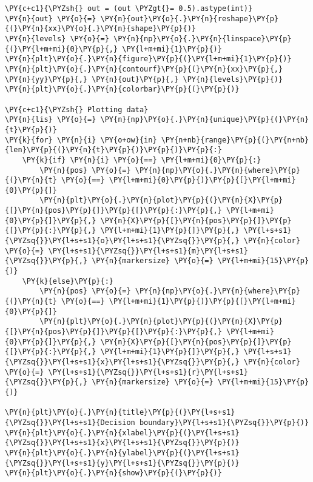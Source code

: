 \begin{tcolorbox}[breakable, size=fbox, boxrule=1pt, pad at break*=1mm,colback=cellbackground, colframe=cellborder]
\begin{Verbatim}[commandchars=\\\{\}]
\PY{c+c1}{\PYZsh{} out = (out \PYZgt{}= 0.5).astype(int)}
\PY{n}{out} \PY{o}{=} \PY{n}{out}\PY{o}{.}\PY{n}{reshape}\PY{p}{(}\PY{n}{xx}\PY{o}{.}\PY{n}{shape}\PY{p}{)}
\PY{n}{levels} \PY{o}{=} \PY{n}{np}\PY{o}{.}\PY{n}{linspace}\PY{p}{(}\PY{l+m+mi}{0}\PY{p}{,} \PY{l+m+mi}{1}\PY{p}{)}
\PY{n}{plt}\PY{o}{.}\PY{n}{figure}\PY{p}{(}\PY{l+m+mi}{1}\PY{p}{)}
\PY{n}{plt}\PY{o}{.}\PY{n}{contourf}\PY{p}{(}\PY{n}{xx}\PY{p}{,} \PY{n}{yy}\PY{p}{,} \PY{n}{out}\PY{p}{,} \PY{n}{levels}\PY{p}{)}
\PY{n}{plt}\PY{o}{.}\PY{n}{colorbar}\PY{p}{(}\PY{p}{)}
 
\PY{c+c1}{\PYZsh{} Plotting data}
\PY{n}{lis} \PY{o}{=} \PY{n}{np}\PY{o}{.}\PY{n}{unique}\PY{p}{(}\PY{n}{t}\PY{p}{)}
\PY{k}{for} \PY{n}{i} \PY{o+ow}{in} \PY{n+nb}{range}\PY{p}{(}\PY{n+nb}{len}\PY{p}{(}\PY{n}{t}\PY{p}{)}\PY{p}{)}\PY{p}{:}
    \PY{k}{if} \PY{n}{i} \PY{o}{==} \PY{l+m+mi}{0}\PY{p}{:}
        \PY{n}{pos} \PY{o}{=} \PY{n}{np}\PY{o}{.}\PY{n}{where}\PY{p}{(}\PY{n}{t} \PY{o}{==} \PY{l+m+mi}{0}\PY{p}{)}\PY{p}{[}\PY{l+m+mi}{0}\PY{p}{]}
        \PY{n}{plt}\PY{o}{.}\PY{n}{plot}\PY{p}{(}\PY{n}{X}\PY{p}{[}\PY{n}{pos}\PY{p}{]}\PY{p}{[}\PY{p}{:}\PY{p}{,} \PY{l+m+mi}{0}\PY{p}{]}\PY{p}{,} \PY{n}{X}\PY{p}{[}\PY{n}{pos}\PY{p}{]}\PY{p}{[}\PY{p}{:}\PY{p}{,} \PY{l+m+mi}{1}\PY{p}{]}\PY{p}{,} \PY{l+s+s1}{\PYZsq{}}\PY{l+s+s1}{o}\PY{l+s+s1}{\PYZsq{}}\PY{p}{,} \PY{n}{color} \PY{o}{=} \PY{l+s+s1}{\PYZsq{}}\PY{l+s+s1}{m}\PY{l+s+s1}{\PYZsq{}}\PY{p}{,} \PY{n}{markersize} \PY{o}{=} \PY{l+m+mi}{15}\PY{p}{)}
    \PY{k}{else}\PY{p}{:}
        \PY{n}{pos} \PY{o}{=} \PY{n}{np}\PY{o}{.}\PY{n}{where}\PY{p}{(}\PY{n}{t} \PY{o}{==} \PY{l+m+mi}{1}\PY{p}{)}\PY{p}{[}\PY{l+m+mi}{0}\PY{p}{]}
        \PY{n}{plt}\PY{o}{.}\PY{n}{plot}\PY{p}{(}\PY{n}{X}\PY{p}{[}\PY{n}{pos}\PY{p}{]}\PY{p}{[}\PY{p}{:}\PY{p}{,} \PY{l+m+mi}{0}\PY{p}{]}\PY{p}{,} \PY{n}{X}\PY{p}{[}\PY{n}{pos}\PY{p}{]}\PY{p}{[}\PY{p}{:}\PY{p}{,} \PY{l+m+mi}{1}\PY{p}{]}\PY{p}{,} \PY{l+s+s1}{\PYZsq{}}\PY{l+s+s1}{x}\PY{l+s+s1}{\PYZsq{}}\PY{p}{,} \PY{n}{color} \PY{o}{=} \PY{l+s+s1}{\PYZsq{}}\PY{l+s+s1}{r}\PY{l+s+s1}{\PYZsq{}}\PY{p}{,} \PY{n}{markersize} \PY{o}{=} \PY{l+m+mi}{15}\PY{p}{)}
 
\PY{n}{plt}\PY{o}{.}\PY{n}{title}\PY{p}{(}\PY{l+s+s1}{\PYZsq{}}\PY{l+s+s1}{Decision boundary}\PY{l+s+s1}{\PYZsq{}}\PY{p}{)}
\PY{n}{plt}\PY{o}{.}\PY{n}{xlabel}\PY{p}{(}\PY{l+s+s1}{\PYZsq{}}\PY{l+s+s1}{x}\PY{l+s+s1}{\PYZsq{}}\PY{p}{)}
\PY{n}{plt}\PY{o}{.}\PY{n}{ylabel}\PY{p}{(}\PY{l+s+s1}{\PYZsq{}}\PY{l+s+s1}{y}\PY{l+s+s1}{\PYZsq{}}\PY{p}{)}
\PY{n}{plt}\PY{o}{.}\PY{n}{show}\PY{p}{(}\PY{p}{)}
\end{Verbatim}
\end{tcolorbox}

